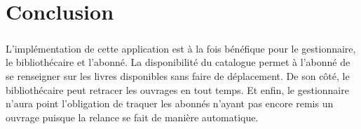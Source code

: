 \chapter{Conclusion}
\paragraph{}
L'implémentation de cette application est à la fois bénéfique pour le gestionnaire,
le bibliothécaire et l'abonné. La disponibilité du catalogue permet à l'abonné de 
se renseigner sur les livres disponibles sans faire de déplacement. De son côté, le 
bibliothécaire peut retracer les ouvrages en tout temps. Et enfin, le gestionnaire n'aura 
point l'obligation de traquer les abonnés n'ayant pas encore remis un ouvrage
puisque la relance se fait de manière automatique.   